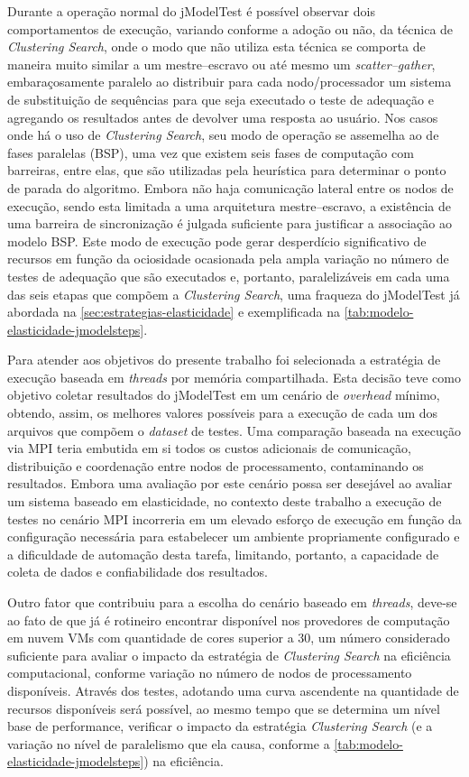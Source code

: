 \documentclass[english,brazilian]{UNISINOSmonografia} %
\begin{document}
Durante a operação normal do jModelTest é possível observar dois comportamentos de execução, variando conforme a adoção ou não, da técnica de \textit{Clustering Search}, onde o modo que não utiliza esta técnica se comporta de maneira muito similar a um mestre--escravo ou até mesmo um \textit{scatter--gather}, embaraçosamente paralelo ao distribuir para cada nodo/processador um sistema de substituição de sequências para que seja executado o teste de adequação e agregando os resultados antes de devolver uma resposta ao usuário.
Nos casos onde há o uso de \textit{Clustering Search}, seu modo de operação se assemelha ao de fases paralelas (BSP), uma vez que existem seis fases de computação com barreiras, entre elas, que são utilizadas pela heurística para determinar o ponto de parada do algoritmo.
Embora não haja comunicação lateral entre os nodos de execução, sendo esta limitada a uma arquitetura mestre--escravo, a existência de uma barreira de sincronização é julgada suficiente para justificar a associação ao modelo BSP.
Este modo de execução pode gerar desperdício significativo de recursos em função da ociosidade ocasionada pela ampla variação no número de testes de adequação que são executados e, portanto, paralelizáveis em cada uma das seis etapas que compõem a \textit{Clustering Search}, uma fraqueza do jModelTest já abordada na \autoref{sec:estrategias-elasticidade} e exemplificada na \autoref{tab:modelo-elasticidade-jmodelsteps}.


Para atender aos objetivos do presente trabalho foi selecionada a estratégia de execução baseada em \textit{threads} por memória compartilhada.
Esta decisão teve como objetivo coletar resultados do jModelTest em um cenário de \textit{overhead} mínimo, obtendo, assim, os melhores valores possíveis para a execução de cada um dos arquivos que compõem o \textit{dataset} de testes.
Uma comparação baseada na execução via MPI teria embutida em si todos os custos adicionais de comunicação, distribuição e coordenação entre nodos de processamento, contaminando os resultados.
Embora uma avaliação por este cenário possa ser desejável ao avaliar um sistema baseado em elasticidade, no contexto deste trabalho a execução de testes no cenário MPI incorreria em um elevado esforço de execução em função da configuração necessária para estabelecer um ambiente propriamente configurado e a dificuldade de automação desta tarefa, limitando, portanto, a capacidade de coleta de dados e confiabilidade dos resultados.


Outro fator que contribuiu para a escolha do cenário baseado em \textit{threads}, deve-se ao fato de que já é rotineiro encontrar disponível nos provedores de computação em nuvem VMs com quantidade de cores superior a 30, um número considerado suficiente para avaliar o impacto da estratégia de \textit{Clustering Search} na eficiência computacional, conforme variação no número de nodos de processamento disponíveis.
Através dos testes, adotando uma curva ascendente na quantidade de recursos disponíveis será possível, ao mesmo tempo que se determina um nível base de performance, verificar o impacto da estratégia \textit{Clustering Search} (e a variação no nível de paralelismo que ela causa, conforme a \autoref{tab:modelo-elasticidade-jmodelsteps}) na eficiência.
\end{document}
